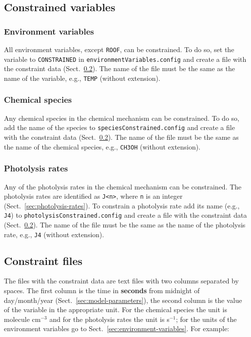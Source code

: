 \subsection{Constrained variables} \label{subsec:constrained-variables}

\subsubsection{Environment variables}

All environment variables, except \texttt{ROOF}, can be
constrained. To do so, set the variable to \texttt{CONSTRAINED} in
\texttt{environmentVariables.config} and create
a file with the constraint data (Sect.~\ref{subsec:constraint-files}). The name of the file must be the
same as the name of the variable, e.g., \texttt{TEMP} (without
extension).

\subsubsection{Chemical species}

Any chemical species in the chemical mechanism can be constrained. To
do so, add the name of the species to
\texttt{speciesConstrained.config} and create a
file with the constraint data (Sect.~\ref{subsec:constraint-files}). The name of the file must be the same
as the name of the chemical species, e.g., \texttt{CH3OH} (without
extension).

\subsubsection{Photolysis rates}

Any of the photolysis rates in the chemical mechanism can be
constrained. The photolysis rates are identified as \verb|J<n>|, where
\texttt{n} is an integer (Sect.~\ref{sec:photolysis-rates}). To
constrain a photolysis rate add its name (e.g., \texttt{J4}) to
\texttt{photolysisConstrained.config} and create
a file with the constraint data (Sect.~\ref{subsec:constraint-files}). The name of the file must be the
same as the name of the photolysis rate, e.g., \texttt{J4} (without
extension).

\subsection{Constraint files} \label{subsec:constraint-files}

The files with the constraint data are text files with two columns
separated by spaces. The first column is the time in \textbf{seconds}
from midnight of day/month/year (Sect.~\ref{sec:model-parameters}),
the second column is the value of the variable in the appropriate
unit. For the chemical species the unit is molecule cm$^{-3}$ and
for the photolysis rates the unit is s$^{-1}$; for the units of the environment
variables go to Sect.~\ref{sec:environment-variables}. For example:

